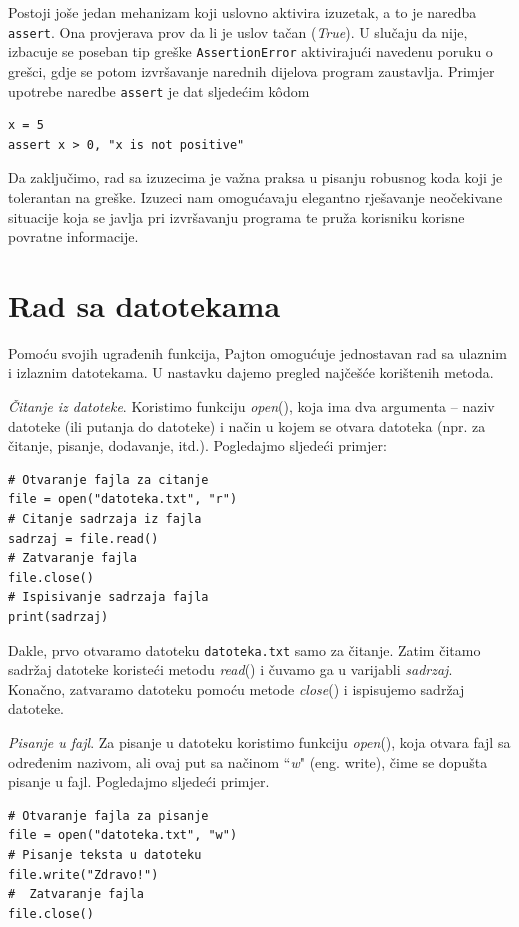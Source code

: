 Postoji joše jedan mehanizam koji uslovno aktivira izuzetak, a to je naredba \texttt{assert}. Ona provjerava prov da li je uslov tačan (\emph{True}). U slučaju da nije, izbacuje se poseban tip greške \texttt{AssertionError} aktivirajući navedenu poruku o grešci, gdje se potom izvršavanje narednih dijelova program zaustavlja. Primjer upotrebe naredbe \texttt{assert} je dat sljedećim k\^odom

\begin{verbatim}
x = 5
assert x > 0, "x is not positive"
\end{verbatim}

Da zaključimo, rad sa izuzecima je važna praksa u pisanju robusnog koda koji je tolerantan na greške. Izuzeci nam omogućavaju elegantno rješavanje neočekivane situacije koja se javlja pri izvršavanju programa te pruža  korisniku korisne povratne informacije. 

\section{Rad sa datotekama}

Pomoću svojih ugrađenih funkcija, Pajton omogućuje jednostavan rad sa ulaznim i izlaznim datotekama. U nastavku dajemo pregled najčešće korištenih metoda.

\textit{Čitanje iz datoteke}. Koristimo funkciju \textit{open}(), koja ima dva argumenta -- naziv datoteke (ili putanja do datoteke) i način u kojem se otvara datoteka (npr. za čitanje, pisanje, dodavanje, itd.). Pogledajmo sljedeći primjer: 
\begin{verbatim}
# Otvaranje fajla za citanje
file = open("datoteka.txt", "r")
# Citanje sadrzaja iz fajla 
sadrzaj = file.read()
# Zatvaranje fajla
file.close()
# Ispisivanje sadrzaja fajla 
print(sadrzaj)
\end{verbatim}

Dakle, prvo otvaramo datoteku  \texttt{datoteka.txt} samo za čitanje. Zatim čitamo sadržaj datoteke koristeći metodu \textit{read}() i čuvamo ga u varijabli \textit{sadrzaj}. Konačno, zatvaramo datoteku pomoću metode \textit{close}() i ispisujemo sadržaj datoteke. 



\textit{Pisanje u fajl}. Za pisanje u datoteku koristimo funkciju \textit{open}(), koja otvara fajl sa određenim nazivom, ali ovaj put sa načinom ``\textit{w}" (eng. write), čime se dopušta pisanje u fajl. Pogledajmo sljedeći primjer.
\begin{verbatim}
# Otvaranje fajla za pisanje
file = open("datoteka.txt", "w")
# Pisanje teksta u datoteku
file.write("Zdravo!")
#  Zatvaranje fajla 
file.close()
\end{verbatim}


